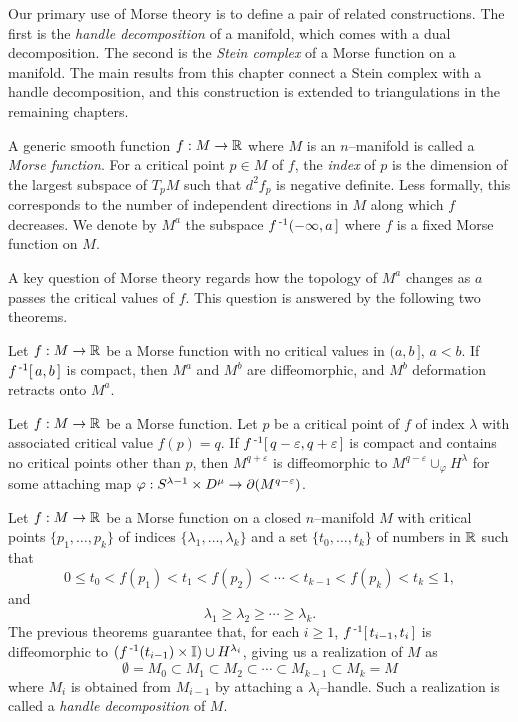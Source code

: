 \label{sec:morsetheory}

Our primary use of Morse theory is to define a pair of related constructions.
The first is the \emph{handle decomposition} of a manifold, which comes with a dual decomposition.
The second is the \emph{Stein complex} of a Morse function on a manifold.
The main results from this chapter connect a Stein complex with a handle decomposition, and this construction is extended to triangulations in the remaining chapters.

\begin{defn}
  A generic smooth function $f:M\to\mathbb{R}$ where $M$ is an $n$--manifold is called a \emph{Morse function}.
  For a critical point $p\in M$ of $f$, the \emph{index} of $p$ is the dimension of the largest subspace of $T_p M$ such that $d^2f_p$ is negative definite.
  Less formally, this corresponds to the number of independent directions in $M$ along which $f$ decreases.
  We denote by $M^a$ the subspace $f^{\,\text{-}1}(-\infty,a\,]$ where $f$ is a fixed Morse function on $M$.
\end{defn}

A key question of Morse theory regards how the topology of $M^a$ changes as $a$ passes the critical values of $f$.
This question is answered by the following two theorems.

\begin{theorem}
  \label{thm:morseretract}
  Let $f:M\to\mathbb{R}$ be a Morse function with no critical values in $(a,b\,]$, $a<b$.
  If $f^{\,\text{-}1}[\,a,b\,]$ is compact, then $M^a$ and $M^b$ are diffeomorphic, and $M^b$ deformation retracts onto $M^a$.
\end{theorem}

\begin{theorem}
  \label{thm:morsehandle}
  Let $f:M\to\mathbb{R}$ be a Morse function.
  Let $p$ be a critical point of $f$ of index $\lambda$ with associated critical value $f(p)=q$.
  If $f^{\,\text{-}1}[\,q-\varepsilon, q+\varepsilon\,]$ is compact and contains no critical points other than $p$, then $M^{q+\varepsilon}$ is diffeomorphic to $M^{q-\varepsilon}\cup_\varphi H^\lambda$ for some attaching map $\varphi:S^{\lambda-1}\times D^\mu\to \partial(M^{q-\varepsilon})$.
\end{theorem}

\begin{defn}
  Let $f:M\to\mathbb{R}$ be a Morse function on a closed $n$--manifold $M$ with critical points $\{p_1,\dots,p_k\}$ of indices $\{\lambda_1,\dots,\lambda_k\}$ and a set $\{t_0,\dots,t_k\}$ of numbers in $\mathbb{R}$ such that
  \[
	0\leq t_0 < f(p_1) < t_1 < f(p_2) < \cdots < t_{k-1} < f(p_k) < t_k \leq 1,
  \]
  and
  \[
	  \lambda_1 \geq \lambda_2 \geq \cdots \geq \lambda_k.
  \]
  The previous theorems guarantee that, for each $i\geq 1$, $f^{\,\text{-}1}[\,t_{i-1},t_i\,]$ is diffeomorphic to $(f^{\,\text{-}1}(t_{i-1})\times\mathbb{I})\cup H^{\lambda_i}$, giving us a realization of $M$ as
  \[
	  \emptyset = M_0 \subset M_1 \subset M_2 \subset \cdots \subset M_{k-1} \subset M_k = M
  \]
  where $M_i$ is obtained from $M_{i-1}$ by attaching a $\lambda_i$--handle.
  Such a realization is called a \emph{handle decomposition} of $M$.
\end{defn}

